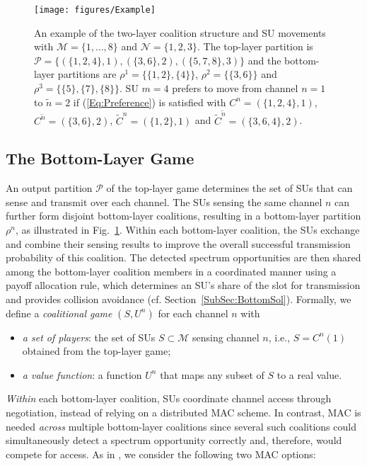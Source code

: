 \documentclass[journal,draftclsnofoot,onecolumn]{IEEEtran}
\theoremstyle{definition}
\begin{document}
\begin{figure}[!t]
    \centering
    \texttt{[image: figures/Example]}
    \caption{An example of the two-layer coalition structure and SU movements  with $\mathcal{M}=\{1,\ldots,8\}$ and $\mathcal{N}=\{1,2,3\}$. The top-layer partition is ${\mathcal P} = \{ (\{ 1,2,4\} ,1),(\{ 3,6\} ,2),(\{ 5,7,8\} ,3)\}$ and the bottom-layer partitions are ${\rho ^1} = \{ \{ 1,2\} ,\{ 4\} \}$, ${\rho ^2} = \{ \{ 3,6\} \} $ and ${\rho ^3} = \{ \{ 5\} ,\{ 7\} ,\{ 8\} \}$. SU $m=4$ prefers to move from channel $n=1$ to $\tilde{n}=2$ if (\ref{Eq:Preference}) is satisfied with $C^n=(\{1,2,4\},1)$, $C^{\tilde n}=(\{3,6\},2)$,  $\tilde{C}^n=(\{1,2\},1)$ and $\tilde{C}^{\tilde{n}}=(\{3,6,4\},2)$.}
    \label{Fig:Example}
\end{figure}

\subsection{The Bottom-Layer Game}\label{SubSec:BottomDef}
An output partition $\mathcal{P}$ of the top-layer game determines the set of SUs that can sense and transmit over each channel. The SUs sensing the same channel $n$ can further form disjoint bottom-layer coalitions, resulting in a bottom-layer partition $\rho^n$, as illustrated in Fig.~\ref{Fig:Example}. Within each bottom-layer coalition, the SUs exchange and combine their sensing results to improve the overall successful transmission probability of this coalition. The detected spectrum opportunities are then shared among the bottom-layer coalition members in a coordinated manner using a payoff allocation rule, which determines an SU's share of the slot for transmission and provides collision avoidance (cf. Section~\ref{SubSec:BottomSol}). Formally, we define a \emph{coalitional game} $(S,U^n)$ \cite{CoalGameSurvey} for each channel $n$ with
\begin{itemize}
	\item  \emph{a set of players}: the set of SUs $S\subset \mathcal{M}$ sensing channel $n$, i.e., $S=C^n(1)$ obtained from the top-layer game;
  \item  \emph{a value function}: a function $U^n$ that maps any subset of $S$ to a real value.
\end{itemize}

\emph{Within }each bottom-layer coalition, SUs coordinate channel access through negotiation, instead of relying on a distributed MAC scheme. In contrast, MAC is needed \emph{across} multiple bottom-layer coalitions since several such coalitions could simultaneously detect a spectrum opportunity correctly and, therefore, would compete for access. As in \cite{QZhaoTDFS}, we consider the following two MAC options:
\end{document}
